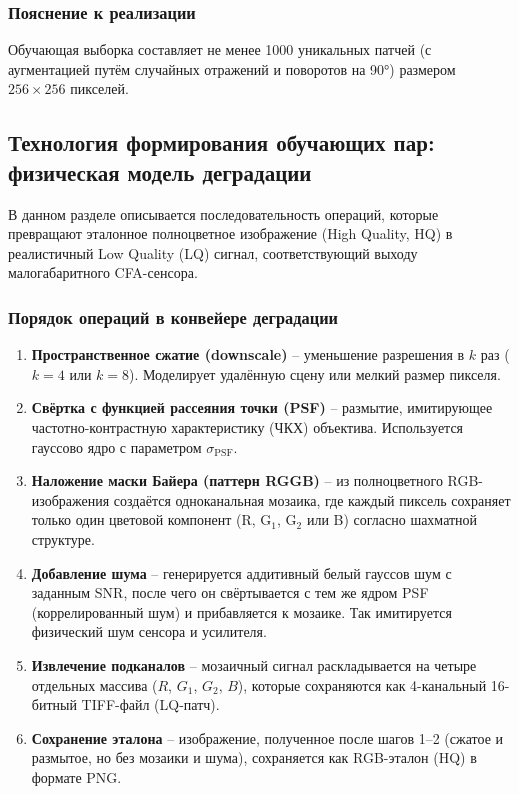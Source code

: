 \documentclass[12pt,a4paper]{article}
\begin{document}
\subsubsection{Пояснение к реализации}
Обучающая выборка составляет не менее 1000 уникальных патчей (с аугментацией путём случайных отражений и поворотов на 90°) размером $256\times256$ пикселей.

\subsection{Технология формирования обучающих пар: физическая модель деградации}
\label{sec:bayer_preparation}

В данном разделе описывается последовательность операций, которые превращают эталонное полноцветное изображение (High Quality, HQ) в реалистичный Low Quality (LQ) сигнал, соответствующий выходу малогабаритного CFA-сенсора.

\subsubsection{Порядок операций в конвейере деградации}

\begin{enumerate}
    \item \textbf{Пространственное сжатие (downscale)} – уменьшение разрешения в $k$ раз ($k=4$ или $k=8$). Моделирует удалённую сцену или мелкий размер пикселя.
    \item \textbf{Свёртка с функцией рассеяния точки (PSF)} – размытие, имитирующее частотно-контрастную характеристику (ЧКХ) объектива. Используется гауссово ядро с параметром $\sigma_{\text{PSF}}$.
    \item \textbf{Наложение маски Байера (паттерн RGGB)} – из полноцветного RGB-изображения создаётся одноканальная мозаика, где каждый пиксель сохраняет только один цветовой компонент (R, G$_1$, G$_2$ или B) согласно шахматной структуре.
    \item \textbf{Добавление шума} – генерируется аддитивный белый гауссов шум с заданным SNR, после чего он свёртывается с тем же ядром PSF (коррелированный шум) и прибавляется к мозаике. Так имитируется физический шум сенсора и усилителя.
    \item \textbf{Извлечение подканалов} – мозаичный сигнал раскладывается на четыре отдельных массива ($R$, $G_1$, $G_2$, $B$), которые сохраняются как 4-канальный 16-битный TIFF-файл (LQ-патч).
    \item \textbf{Сохранение эталона} – изображение, полученное после шагов 1–2 (сжатое и размытое, но без мозаики и шума), сохраняется как RGB-эталон (HQ) в формате PNG.
\end{enumerate}
\end{document}
